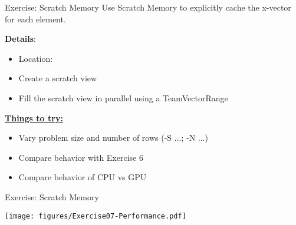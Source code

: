 
\begin{frame}[fragile]{Exercise: Scratch Memory}
Use Scratch Memory to explicitly cache the x-vector for each element.

  \vspace{10pt}

  \textbf{Details}:
  \begin{small}
  \begin{itemize}
\item Location: 
\item Create a scratch view
\item Fill the scratch view in parallel using a TeamVectorRange
\end{itemize}
  \end{small}

\ul{\textbf{Things to try:}}
  \begin{small}
  \begin{itemize}
  \item Vary problem size and number of rows (-S ...; -N ...)
  \item Compare behavior with Exercise 6
  \item Compare behavior of CPU vs GPU
  \end{itemize}
  \end{small}
\end{frame}


\begin{frame}[fragile]{Exercise: Scratch Memory}


    \texttt{[image: figures/Exercise07-Performance.pdf]}

  \vspace{-15pt}

\end{frame}


